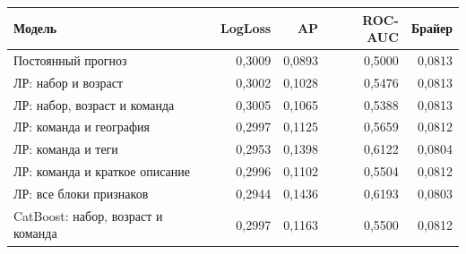 \begin{tabular}{@{}>{\raggedright\arraybackslash}p{7.1cm}rrrr@{}}
\toprule
Модель & LogLoss & AP & ROC-AUC & Брайер \\
\midrule
Постоянный прогноз & 0,3009 & 0,0893 & 0,5000 & 0,0813 \\
ЛР: набор и возраст & 0,3002 & 0,1028 & 0,5476 & 0,0813 \\
ЛР: набор, возраст и команда & 0,3005 & 0,1065 & 0,5388 & 0,0813 \\
ЛР: команда и география & 0,2997 & 0,1125 & 0,5659 & 0,0812 \\
ЛР: команда и теги & 0,2953 & 0,1398 & 0,6122 & 0,0804 \\
ЛР: команда и краткое описание & 0,2996 & 0,1102 & 0,5504 & 0,0812 \\
ЛР: все блоки признаков & 0,2944 & 0,1436 & 0,6193 & 0,0803 \\
CatBoost: набор, возраст и команда & 0,2997 & 0,1163 & 0,5500 & 0,0812 \\
\bottomrule
\end{tabular}
